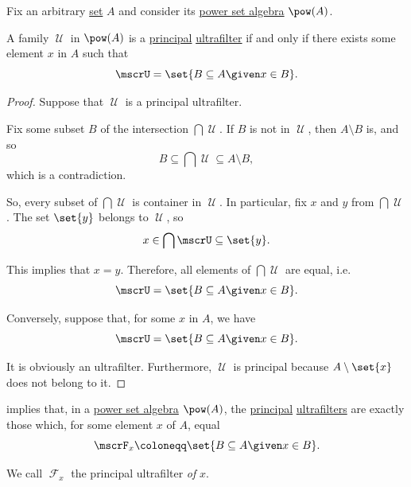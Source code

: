 \begin{proposition}\label{thm:principal_ultrafilter}
  Fix an arbitrary \hyperref[def:set]{set} \( A \) and consider its \hyperref[def:power_set_algebra]{power set algebra} \( \pow(A) \).

  A family \( \mscrU \) in \( \pow(A) \) is a \hyperref[def:lattice_ideal/principal]{principal} \hyperref[def:ultrafilter]{ultrafilter} if and only if there exists some element \( x \) in \( A \) such that
  \begin{equation*}
    \mscrU = \set{ B \subseteq A \given x \in B }.
  \end{equation*}
\end{proposition}
\begin{proof}
  \SufficiencySubProof Suppose that \( \mscrU \) is a principal ultrafilter.

  Fix some subset \( B \) of the intersection \( \bigcap \mscrU \). If \( B \) is not in \( \mscrU \), then \( A \setminus B \) is, and so
  \begin{equation*}
    B \subseteq \bigcap \mscrU \subseteq A \setminus B,
  \end{equation*}
  which is a contradiction.

  So, every subset of \( \bigcap \mscrU \) is container in \( \mscrU \). In particular, fix \( x \) and \( y \) from \( \bigcap \mscrU \). The set \( \set{ y } \) belongs to \( \mscrU \), so
  \begin{equation*}
    x \in \bigcap \mscrU \subseteq \set{ y }.
  \end{equation*}

  This implies that \( x = y \). Therefore, all elements of \( \bigcap \mscrU \) are equal, i.e.
  \begin{equation*}
    \mscrU = \set{ B \subseteq A \given x \in B }.
  \end{equation*}

  \NecessitySubProof Conversely, suppose that, for some \( x \) in \( A \), we have
  \begin{equation*}
    \mscrU = \set{ B \subseteq A \given x \in B }.
  \end{equation*}

  It is obviously an ultrafilter. Furthermore, \( \mscrU \) is principal because \( A \setminus \set{ x } \) does not belong to it.
\end{proof}

\begin{definition}\label{def:principal_ultrafilter}\cite[def. III.1.30]{Kunen2013SetTheory}
   implies that, in a \hyperref[def:power_set_algebra]{power set algebra} \( \pow(A) \), the \hyperref[def:lattice_ideal/principal]{principal} \hyperref[def:ultrafilter]{ultrafilters} are exactly those which, for some element \( x \) of \( A \), equal
  \begin{equation*}
    \mscrF_x \coloneqq \set{ B \subseteq A \given x \in B }.
  \end{equation*}

  We call \( \mscrF_x \) the principal ultrafilter \emph{of} \( x \).
\end{definition}

